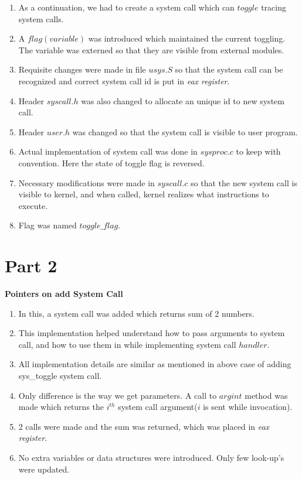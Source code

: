 \documentclass{article}
\newcommand{\bld}[1]{\textbf{#1}}
\newcommand{\ital}[1]{\textit{#1}}
\begin{document}
\begin{enumerate}
	\item As a continuation, we had to create a system call which can $toggle$ tracing system calls.
	\item A $flag(variable)$ was introduced which maintained the current toggling. The variable was externed so that they are visible from external modules.
	\item Requisite changes were made in file $usys.S$ so that the system call can be recognized and correct system call id is put in \ital{eax register}.
	\item Header $syscall.h$ was also changed to allocate an unique id to new system call.
	\item Header $user.h$ was changed so that the system call is visible to user program.
	\item Actual implementation of system call was done in $sysproc.c$ to keep with convention. Here the state of toggle flag is reversed.
	\item Necessary modifications were made in $syscall.c$ so that the new system call is visible to kernel, and when called, kernel realizes what instructions to execute. 
	\item Flag was named $toggle\_flag$.
\end{enumerate}

\section*{Part 2}
\bld{Pointers on add System Call}
\begin{enumerate}
	\item In this, a system call was added which returns sum of 2 numbers.
	\item This implementation helped understand how to pass arguments to system call, and how to use them in while implementing system call $handler$.
	\item All implementation details are similar as mentioned in above case of adding sys\_toggle system call.
	\item Only difference is the way we get parameters. A call to $argint$ method was made which returns the $i^{th}$ system call argument($i$ is sent while invocation).
	\item 2 calls were made and the sum was returned, which was placed in \ital{eax register}.
	\item No extra variables or data structures were introduced. Only few look-up's were updated. 
\end{enumerate}
\end{document}
